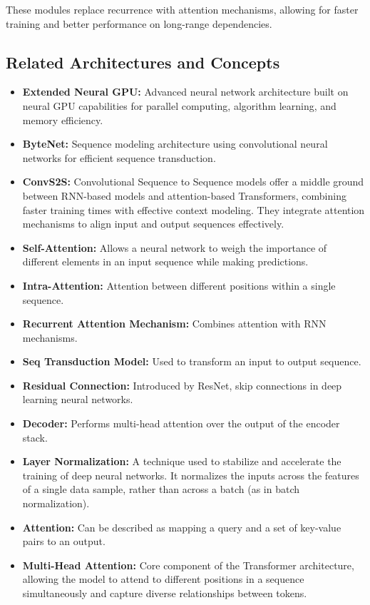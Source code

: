 \documentclass{article}
\begin{document}
These modules replace recurrence with attention mechanisms, allowing for faster training and better performance on long-range dependencies.

\subsection{Related Architectures and Concepts}
\begin{itemize}
    \item \textbf{Extended Neural GPU:} Advanced neural network architecture built on neural GPU capabilities for parallel computing, algorithm learning, and memory efficiency.
    \item \textbf{ByteNet:} Sequence modeling architecture using convolutional neural networks for efficient sequence transduction.
    \item \textbf{ConvS2S:} Convolutional Sequence to Sequence models offer a middle ground between RNN-based models and attention-based Transformers, combining faster training times with effective context modeling. They integrate attention mechanisms to align input and output sequences effectively.
    \item \textbf{Self-Attention:} Allows a neural network to weigh the importance of different elements in an input sequence while making predictions.
    \item \textbf{Intra-Attention:} Attention between different positions within a single sequence.
    \item \textbf{Recurrent Attention Mechanism:} Combines attention with RNN mechanisms.
    \item \textbf{Seq Transduction Model:} Used to transform an input to output sequence.
    \item \textbf{Residual Connection:} Introduced by ResNet, skip connections in deep learning neural networks.
    \item \textbf{Decoder:} Performs multi-head attention over the output of the encoder stack.
    \item \textbf{Layer Normalization:} A technique used to stabilize and accelerate the training of deep neural networks. It normalizes the inputs across the features of a single data sample, rather than across a batch (as in batch normalization).
    \item \textbf{Attention:} Can be described as mapping a query and a set of key-value pairs to an output.
    \item \textbf{Multi-Head Attention:} Core component of the Transformer architecture, allowing the model to attend to different positions in a sequence simultaneously and capture diverse relationships between tokens.

\end{itemize}
\end{document}
